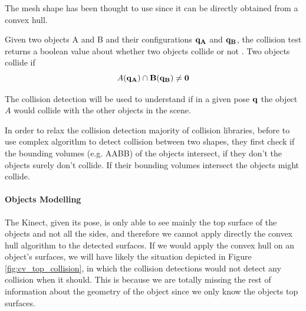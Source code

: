 The mesh shape has been thought to use since it can be directly obtained from a convex hull. 

Given two objects A and B and their configurations $\bf{q_A}$ and $\bf{q_B}$, the collision test returns a boolean value about whether two objects collide or not \citep{pan2012fcl}. Two objects collide if
\[
A(\bf{q_A}) \cap B(\bf{q_B}) \neq 0
\]

The collision detection will be used to understand if in a given pose $\bf{q}$ the object $A$ would collide with the other objects in the scene.

In order to relax the collision detection majority of collision libraries, before to use complex algorithm to detect collision between two shapes, they first check if the bounding volumes (e.g. AABB) of the objects intersect, if they don't the objects surely don't collide. If their bounding volumes intersect the objects might collide.

\paragraph{Objects Modelling}
The Kinect, given its pose, is only able to see mainly the top surface of the objects and not all the sides, and therefore we cannot apply directly the convex hull algorithm to the detected surfaces. If we would apply the convex hull on an object's surfaces, we will have likely the situation depicted in Figure \ref{fig:cv_top_collision}, in which the collision detections would not detect any collision when it should. This is because we are totally missing the rest of information about the geometry of the object since we only know the objects top surfaces.

